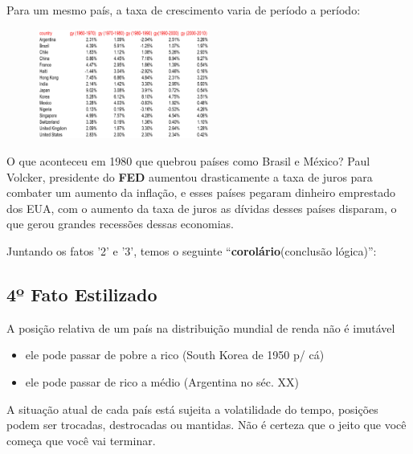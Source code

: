 \documentclass[a4paper,12pt]{article}[abntex2]
\begin{document}
Para um mesmo país, a taxa de crescimento varia de período a período:

\begin{figure}[H]
        \centering
        \includegraphics[width=0.5\textwidth]{Imagens/a1i12.png}
\end{figure}

O que aconteceu em 1980 que quebrou países como Brasil e México? Paul Volcker, presidente do \textbf{FED} aumentou drasticamente a taxa de juros para combater um aumento da inflação, e esses países pegaram dinheiro emprestado dos EUA, com o aumento da taxa de juros as dívidas desses países disparam, o que gerou grandes recessões dessas economias. 

Juntando os fatos '2' e '3', temos o seguinte “\textbf{corolário}(conclusão lógica)”:

\subsection{\textbf{4º Fato Estilizado}}
A posição relativa de um país na distribuição mundial de renda não é imutável \begin{itemize}
    \item ele pode passar de pobre a rico (South Korea de 1950 p/ cá)
    \item ele pode passar de rico a médio (Argentina no séc. XX)
\end{itemize}

A situação atual de cada país está sujeita a volatilidade do tempo, posições podem ser trocadas, destrocadas ou mantidas. Não é certeza que o jeito que você começa que você vai terminar.
\end{document}
